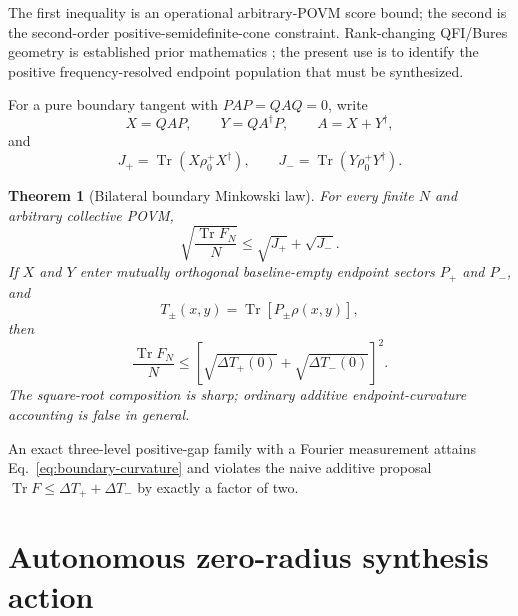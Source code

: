 \documentclass[aps,pra,preprint,nofootinbib]{revtex4-2}
\newtheorem{theorem}{Theorem}
\newcommand{\Tr}{\operatorname{Tr}}
\newcommand{\rhozero}{\rho_0}
\newcommand{\Fcl}{F}
\begin{document}
The first inequality is an operational arbitrary-POVM score bound; the second is the second-order positive-semidefinite-cone constraint.  Rank-changing QFI/Bures geometry is established prior mathematics \cite{Safranek2017}; the present use is to identify the positive frequency-resolved endpoint population that must be synthesized.

For a pure boundary tangent with $PAP=QAQ=0$, write
\begin{equation}
X=QAP,\qquad Y=QA^\dagger P,\qquad A=X+Y^\dagger,
\end{equation}
and
\begin{equation}
J_+=\Tr(X\rhozero^+X^\dagger),\qquad
J_-=\Tr(Y\rhozero^+Y^\dagger).
\end{equation}

\begin{theorem}[Bilateral boundary Minkowski law]
\label{thm:bilateral-boundary}
For every finite $N$ and arbitrary collective POVM,
\begin{equation}
\boxed{
\sqrt{\frac{\Tr \Fcl_N}{N}}
\le \sqrt{J_+}+\sqrt{J_-}.
}
\label{eq:boundary-minkowski}
\end{equation}
If $X$ and $Y$ enter mutually orthogonal baseline-empty endpoint sectors $P_+$ and $P_-$, and
\begin{equation}
T_\pm(x,y)=\Tr[P_\pm\rho(x,y)],
\end{equation}
then
\begin{equation}
\boxed{
\frac{\Tr \Fcl_N}{N}
\le
\left[\sqrt{\Delta T_+(0)}+\sqrt{\Delta T_-(0)}\right]^2.
}
\label{eq:boundary-curvature}
\end{equation}
The square-root composition is sharp; ordinary additive endpoint-curvature accounting is false in general.
\end{theorem}

An exact three-level positive-gap family with a Fourier measurement attains Eq.~\eqref{eq:boundary-curvature} and violates the naive additive proposal $\Tr F\le\Delta T_++\Delta T_-$ by exactly a factor of two.

\section{Autonomous zero-radius synthesis action}
\label{sec:autonomous-action}

\end{document}
